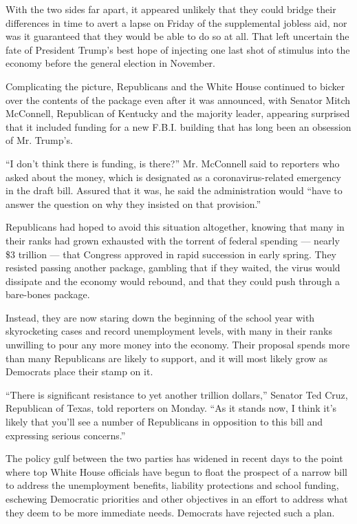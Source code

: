 With the two sides far apart, it appeared unlikely that they could
bridge their differences in time to avert a lapse on Friday of the
supplemental jobless aid, nor was it guaranteed that they would be able
to do so at all. That left uncertain the fate of President Trump's best
hope of injecting one last shot of stimulus into the economy before the
general election in November.

Complicating the picture, Republicans and the White House continued to
bicker over the contents of the package even after it was announced,
with Senator Mitch McConnell, Republican of Kentucky and the majority
leader, appearing surprised that it included funding for a new F.B.I.
building that has long been an obsession of Mr. Trump's.

``I don't think there is funding, is there?'' Mr. McConnell said to
reporters who asked about the money, which is designated as a
coronavirus-related emergency in the draft bill. Assured that it was, he
said the administration would ``have to answer the question on why they
insisted on that provision.''

Republicans had hoped to avoid this situation altogether, knowing that
many in their ranks had grown exhausted with the torrent of federal
spending --- nearly \$3 trillion --- that Congress approved in rapid
succession in early spring. They resisted passing another package,
gambling that if they waited, the virus would dissipate and the economy
would rebound, and that they could push through a bare-bones package.

Instead, they are now staring down the beginning of the school year with
skyrocketing cases and record unemployment levels, with many in their
ranks unwilling to pour any more money into the economy. Their proposal
spends more than many Republicans are likely to support, and it will
most likely grow as Democrats place their stamp on it.

``There is significant resistance to yet another trillion dollars,''
Senator Ted Cruz, Republican of Texas, told reporters on Monday. ``As it
stands now, I think it's likely that you'll see a number of Republicans
in opposition to this bill and expressing serious concerns.''

The policy gulf between the two parties has widened in recent days to
the point where top White House officials have begun to float the
prospect of a narrow bill to address the unemployment benefits,
liability protections and school funding, eschewing Democratic
priorities and other objectives in an effort to address what they deem
to be more immediate needs. Democrats have rejected such a plan.

